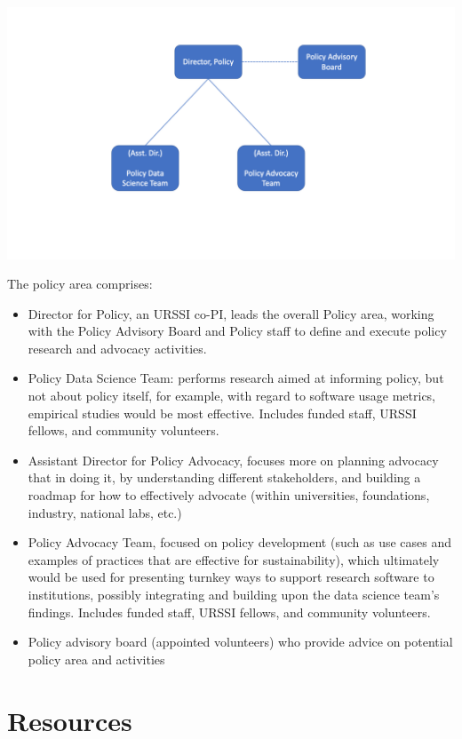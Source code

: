 \documentclass[
]{book}
\begin{document}
\includegraphics{images/policy_structure.png}

The policy area comprises:

\begin{itemize}
\item
  Director for Policy, an URSSI co-PI, leads the overall Policy area, working with the
  Policy Advisory Board and Policy staff to define and execute policy research and advocacy activities.
\item
  Policy Data Science Team: performs research aimed at informing policy, but not about policy
  itself, for example, with regard to software usage metrics, empirical studies would be most effective.
  Includes funded staff, URSSI fellows, and community volunteers.
\item
  Assistant Director for Policy Advocacy, focuses more on planning advocacy that in doing it,
  by understanding different stakeholders, and building a roadmap for how to effectively advocate
  (within universities, foundations, industry, national labs, etc.)
\item
  Policy Advocacy Team, focused on policy development (such as use cases and examples of practices
  that are effective for sustainability), which ultimately would be used for presenting turnkey ways
  to support research software to institutions, possibly integrating and building upon the data science
  team's findings. Includes funded staff, URSSI fellows, and community volunteers.
\item
  Policy advisory board (appointed volunteers) who provide advice on potential policy area and activities
\end{itemize}

\hypertarget{resources}{%
\section{Resources}\label{resources}}
\end{document}
